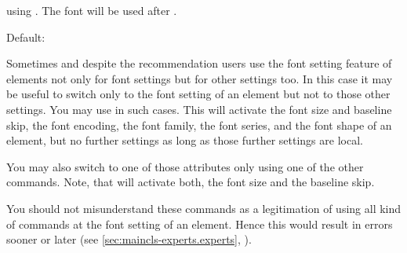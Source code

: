 {{\begin{desclist}
{            using . The font will be used after
            .\par
            Default: %
          }%
        \end{desclist}
      }{%
      }%
    }%
  \fi%
\fi
\EndIndexGroup


\begin{Declaration}
\end{Declaration}
Sometimes and despite the recommendation
users use the font setting feature of elements not only for font settings but
for other settings too. In this case it may be useful to switch only to the
font setting of an element but not to those other settings. You may use
 in such cases. This will activate the font size and
baseline skip, the font encoding, the font family, the font series, and the
font shape of an element, but no further settings as long as those further
settings are local.

You may also switch to one of those attributes only using one of the other
commands. Note, that  will activate both, the font
size and the baseline skip.

You should not misunderstand these commands as a legitimation of using all
kind of commands at the font setting of an element. Hence this would result
in errors sooner or later (see \autoref{sec:maincls-experts.experts},
).%
\EndIndexGroup
%
\EndIndexGroup


